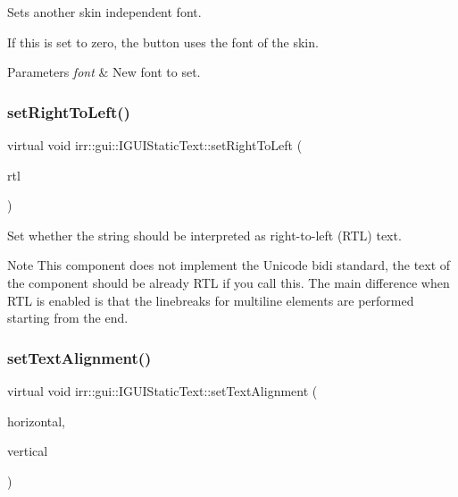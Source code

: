 Sets another skin independent font. 

If this is set to zero, the button uses the font of the skin. 
\begin{DoxyParams}{Parameters}
{\em font} & New font to set. \\
\hline
\end{DoxyParams}
\mbox{\label{classirr_1_1gui_1_1IGUIStaticText_a43cee247cf34faa30851f4e8c10b2367}} 
\subsubsection{\texorpdfstring{set\+Right\+To\+Left()}{setRightToLeft()}}
{\footnotesize\ttfamily virtual void irr\+::gui\+::\+I\+G\+U\+I\+Static\+Text\+::set\+Right\+To\+Left (\begin{DoxyParamCaption}\item[{bool}]{rtl }\end{DoxyParamCaption})\hspace{0.3cm}{\ttfamily [pure virtual]}}



Set whether the string should be interpreted as right-\/to-\/left (R\+TL) text. 

\begin{DoxyNote}{Note}
This component does not implement the Unicode bidi standard, the text of the component should be already R\+TL if you call this. The main difference when R\+TL is enabled is that the linebreaks for multiline elements are performed starting from the end. 
\end{DoxyNote}
\mbox{\label{classirr_1_1gui_1_1IGUIStaticText_ad8635f1247971277543cfff6e1fa9277}} 
\subsubsection{\texorpdfstring{set\+Text\+Alignment()}{setTextAlignment()}}
{\footnotesize\ttfamily virtual void irr\+::gui\+::\+I\+G\+U\+I\+Static\+Text\+::set\+Text\+Alignment (\begin{DoxyParamCaption}\item[{\hyperlink{namespaceirr_1_1gui_a19eb5fb40e67f108cb16aba922ddaa2d}{E\+G\+U\+I\+\_\+\+A\+L\+I\+G\+N\+M\+E\+NT}}]{horizontal,  }\item[{\hyperlink{namespaceirr_1_1gui_a19eb5fb40e67f108cb16aba922ddaa2d}{E\+G\+U\+I\+\_\+\+A\+L\+I\+G\+N\+M\+E\+NT}}]{vertical }\end{DoxyParamCaption})\hspace{0.3cm}{\ttfamily [pure virtual]}}



